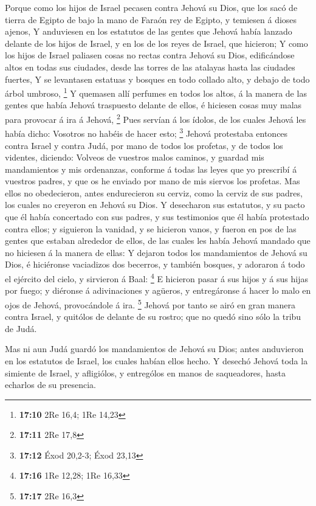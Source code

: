 Porque como los hijos de Israel pecasen contra Jehová su
Dios, que los sacó de tierra de Egipto de bajo la mano de Faraón rey de
Egipto, y temiesen á dioses ajenos,  Y anduviesen en los
estatutos de las gentes que Jehová había lanzado delante de los hijos de
Israel, y en los de los reyes de Israel, que hicieron;  Y
como los hijos de Israel paliasen cosas no rectas contra Jehová su Dios,
edificándose altos en todas sus ciudades, desde las torres de las
atalayas hasta las ciudades fuertes,  Y se levantasen
estatuas y bosques en todo collado alto, y debajo de todo árbol umbroso,
\footnote{\textbf{17:10} 2Re 16,4; 1Re 14,23}  Y quemasen
allí perfumes en todos los altos, á la manera de las gentes que había
Jehová traspuesto delante de ellos, é hiciesen cosas muy malas para
provocar á ira á Jehová, \footnote{\textbf{17:11} 2Re 17,8}
 Pues servían á los ídolos, de los cuales Jehová les había
dicho: Vosotros no habéis de hacer esto; \footnote{\textbf{17:12} Éxod
  20,2-3; Éxod 23,13}  Jehová protestaba entonces contra
Israel y contra Judá, por mano de todos los profetas, y de todos los
videntes, diciendo: Volveos de vuestros malos caminos, y guardad mis
mandamientos y mis ordenanzas, conforme á todas las leyes que yo
prescribí á vuestros padres, y que os he enviado por mano de mis siervos
los profetas.  Mas ellos no obedecieron, antes endurecieron
su cerviz, como la cerviz de sus padres, los cuales no creyeron en
Jehová su Dios.  Y desecharon sus estatutos, y su pacto que
él había concertado con sus padres, y sus testimonios que él había
protestado contra ellos; y siguieron la vanidad, y se hicieron vanos, y
fueron en pos de las gentes que estaban alrededor de ellos, de las
cuales les había Jehová mandado que no hiciesen á la manera de ellas:
 Y dejaron todos los mandamientos de Jehová su Dios, é
hiciéronse vaciadizos dos becerros, y también bosques, y adoraron á todo
el ejército del cielo, y sirvieron á Baal: \footnote{\textbf{17:16} 1Re
  12,28; 1Re 16,33}  E hicieron pasar á sus hijos y á sus
hijas por fuego; y diéronse á adivinaciones y agüeros, y entregáronse á
hacer lo malo en ojos de Jehová, provocándole á ira. \footnote{\textbf{17:17}
  2Re 16,3}  Jehová por tanto se airó en gran manera contra
Israel, y quitólos de delante de su rostro; que no quedó sino sólo la
tribu de Judá.

 Mas ni aun Judá guardó los mandamientos de Jehová su Dios;
antes anduvieron en los estatutos de Israel, los cuales habían ellos
hecho.  Y desechó Jehová toda la simiente de Israel, y
afligiólos, y entrególos en manos de saqueadores, hasta echarlos de su
presencia.

